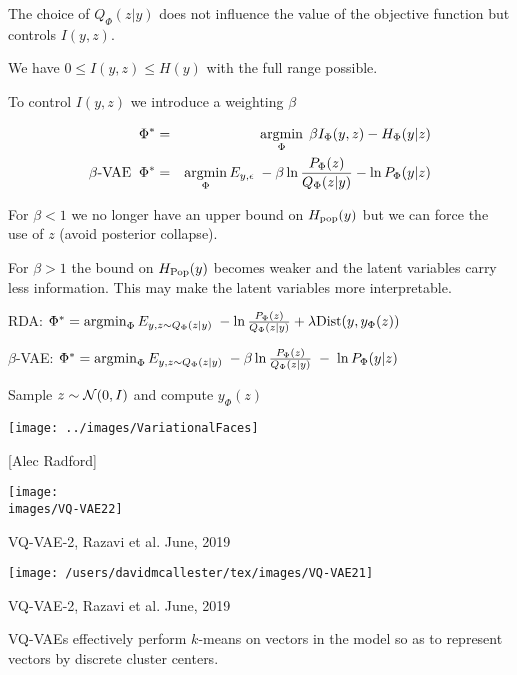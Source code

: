 {\vfill
The choice of $Q_\Phi(z|y)$ does not influence the value of the objective function but controls $I(y,z)$.

\vfill
We have $0 \leq I(y,z) \leq H(y)$ with the full range possible.


To control $I(y,z)$ we introduce a weighting $\beta$

\begin{eqnarray*}
\Phi^* & = & \operatorname*{argmin}_\Phi \; \beta I_\Phi(y,z) - H_\Phi(y|z) \\
\mbox{$\beta$-VAE}\;\; \Phi^* & = & \operatorname*{argmin}_\Phi E_{y,\epsilon}\;-\beta \ln \frac{P_\Phi(z)}{Q_\Phi(z|y)} - \ln P_\Phi(y|z)
\end{eqnarray*}

\vfill
For $\beta < 1$ we no longer have an upper bound on $H_{\mathrm{pop}}(y)$ but we can force the use of $z$ (avoid posterior collapse).

\vfill
For $\beta > 1$ the bound on $H_{\mathrm{Pop}}(y)$ becomes weaker and the latent variables carry less information.  This may make the latent variables more interpretable.


RDA: $\Phi^* = \operatorname*{argmin}_\Phi E_{y,z \sim Q_\Phi(z|y)}\;-\ln \frac{P_\Phi(z)}{Q_\Phi(z|y)} + \lambda \mathrm{Dist}(y,y_\Phi(z))$

\vfill
$\beta$-VAE: $\Phi^* = \operatorname*{argmin}_\Phi E_{y,z \sim Q_\Phi(z|y)}\;-\beta \ln \frac{P_\Phi(z)}{Q_\Phi(z|y)} \;-\;\ln P_\Phi(y|z)$


\centerline{Sample {\color{red} $z \sim {\cal N}(0,I)$} and compute {\color{red} $y_\Phi(z)$}}

\vfill
\centerline{\texttt{[image: ../images/VariationalFaces]}}
\centerline{[Alec Radford]}


\centerline{\texttt{[image: \\images/VQ-VAE22]}}

\vfill
VQ-VAE-2, Razavi et al. June, 2019


\centerline{\texttt{[image: /users/davidmcallester/tex/images/VQ-VAE21]}}

\vfill
VQ-VAE-2, Razavi et al. June, 2019



VQ-VAEs effectively perform $k$-means on vectors in the model so as to represent vectors by discrete cluster centers.

}
